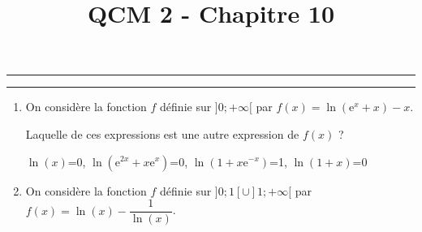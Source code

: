 \documentclass[french]{article}
\title{QCM 2 - Chapitre 10}
\author{\augustin{0.2}}
\date{\classe}
\begin{document}
\begin{spacing}{1.2}

\maketitle


\hrule

\begin{center}
\raisebox{-0.5em}{\tikz[scale=0.3]\coati[sideward];}
\begin{Form}
\end{Form}
\hspace*{1em}
\begin{Form}
\end{Form}
\raisebox{-0.5em}{\tikz[scale=0.3]\coati[sideward,xscale=-1];}
\end{center}

\hrule




\begin{enumerate}
\item On considère la fonction \(f\) définie sur \(]0;+\infty[\) par \(f(x)=\ln\left(\text{e}^x+x\right)-x\).

Laquelle de ces expressions est une autre expression de \(f(x)\) ?

\begin{Form}
\ChoiceMenu[radio,name=Q1,default=-0,align=0,radiosymbol=\ding{108},height=0.5em,bordercolor=black]{}
{\(\ln(x)\)=0,
\newline \(\ln\left(\text{e}^{2x}+x\text{e}^x\right)\)=0,
\newline \(\ln\left(1+x\text{e}^{-x}\right)\)=1,
\newline \(\ln(1+x)\)=0}
\end{Form}

\item On considère la fonction \(f\) définie sur \(]0;1[\cup]1;+\infty[\) par \(f(x)=\ln(x)-\dfrac{1}{\ln(x)}\).


\end{enumerate}
\end{spacing}
\end{document}
